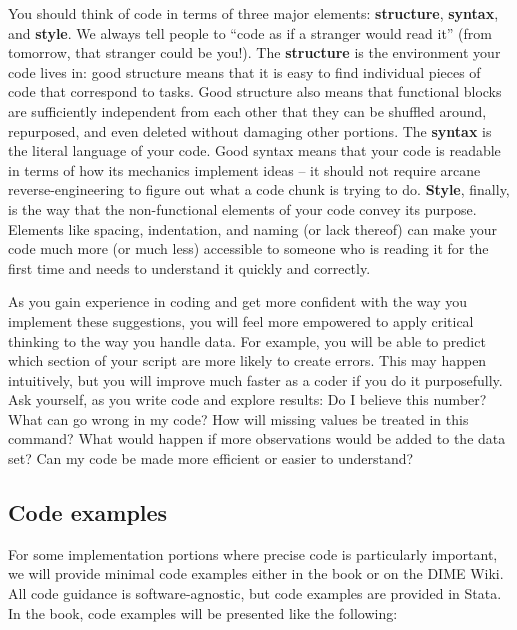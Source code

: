 You should think of code in terms of three major elements:
\textbf{structure}, \textbf{syntax}, and \textbf{style}.
We always tell people to ``code as if a stranger would read it''
(from tomorrow, that stranger could be you!).
The \textbf{structure} is the environment your code lives in:
good structure means that it is easy to find individual pieces of code that correspond to tasks.
Good structure also means that functional blocks are sufficiently independent from each other
that they can be shuffled around, repurposed, and even deleted without damaging other portions.
The \textbf{syntax} is the literal language of your code.
Good syntax means that your code is readable
in terms of how its mechanics implement ideas --
it should not require arcane reverse-engineering
to figure out what a code chunk is trying to do.
\textbf{Style}, finally, is the way that the non-functional elements of your code convey its purpose.
Elements like spacing, indentation, and naming (or lack thereof) can make your code much more
(or much less) accessible to someone who is reading it for the first time and needs to understand it quickly and correctly.

As you gain experience in coding
and get more confident with the way you implement these suggestions,
you will feel more empowered to apply critical thinking to the way you handle data.
For example, you will be able to predict which section
of your script are more likely to create errors.
This may happen intuitively, but you will improve much faster as a coder
if you do it purposefully.
Ask yourself, as you write code and explore results:
Do I believe this number?
What can go wrong in my code?
How will missing values be treated in this command?
What would happen if more observations would be added to the data set?
Can my code be made more efficient or easier to understand?

\subsection{Code examples}
For some implementation portions where precise code is particularly important,
we will provide minimal code examples either in the book or on the DIME Wiki.
All code guidance is software-agnostic, but code examples are provided in Stata.
In the book, code examples will be presented like the following:


